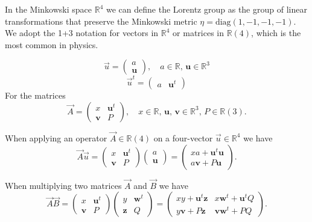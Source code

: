 In the Minkowski space \(\mathbb{R}^{4}\) we can define the Lorentz group as the group of linear transformations that preserve the Minkowski metric \(\eta = \text{diag}(1, -1, -1, -1)\). We adopt the 1+3 notation for vectors in \(\mathbb{R}^{4}\) or matrices in \(\mathbb{R}(4)\), which is the most common in physics.

\[
    \vec{u} = \begin{pmatrix}
        a \\
        \mathbf{u}
    \end{pmatrix}, \quad a \in \mathbb{R}, \, \mathbf{u} \in \mathbb{R}^3
\]
\[
    \vec{u}^t = \begin{pmatrix}
        a & \mathbf{u}^t
    \end{pmatrix}
\]
For the matrices
\[
    \vec{A} = \begin{pmatrix}
        x          & \mathbf{u}^t \\
        \mathbf{v} & P
    \end{pmatrix}, \quad x \in \mathbb{R}, \, \mathbf{u},\,\mathbf{v} \in \mathbb{R}^3, \, P \in \mathbb{R}(3).
\]

When applying an operator \(\vec{A} \in \mathbb{R}(4)\) on a four-vector \(\vec{u} \in \mathbb{R}^4\) we have
\[
    \vec{A}\vec{u} = \begin{pmatrix}
        x          & \mathbf{u}^t \\
        \mathbf{v} & P
    \end{pmatrix} \begin{pmatrix}
        a \\
        \mathbf{u}
    \end{pmatrix} = \begin{pmatrix}
        x a + \mathbf{u}^t \mathbf{u} \\
        a \mathbf{v} + P \mathbf{u}
    \end{pmatrix}.
\]

When multiplying two matrices \(\vec{A}\) and \(\vec{B}\) we have
\[
    \vec{A}\vec{B} = \begin{pmatrix}
        x          & \mathbf{u}^t \\
        \mathbf{v} & P
    \end{pmatrix} \begin{pmatrix}
        y          & \mathbf{w}^t \\
        \mathbf{z} & Q
    \end{pmatrix} = \begin{pmatrix}
        x y + \mathbf{u}^t \mathbf{z} & x \mathbf{w}^t + \mathbf{u}^t Q \\
        y \mathbf{v} + P \mathbf{z}   & \mathbf{v} \mathbf{w}^t + P Q
    \end{pmatrix}.
\]

